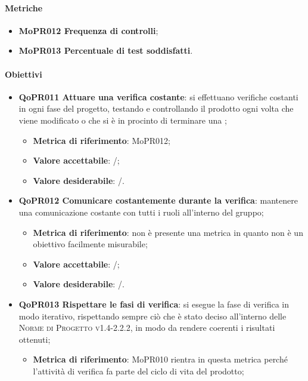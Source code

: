 \documentclass[../piano-di-qualifica.tex]{subfiles}
\begin{document}
\paragraph{Metriche}
\label{sub:metriche_4}
\begin{itemize}
    \item \textbf{MoPR012 Frequenza di controlli};
    \item \textbf{MoPR013 Percentuale di test soddisfatti}.
\end{itemize}

\paragraph{Obiettivi}
\label{sub:obiettivi_4}
\begin{itemize}
    \item \textbf{QoPR011 Attuare una verifica costante}: si effettuano verifiche costanti in ogni fase del progetto, testando e controllando il prodotto ogni volta che viene modificato o che si è in procinto di terminare una ;
    \begin{itemize}
        \item \textbf{Metrica di riferimento}: MoPR012;
        \item \textbf{Valore accettabile}: /; %
        \item \textbf{Valore desiderabile}: /.
    \end{itemize}
    \item \textbf{QoPR012 Comunicare costantemente durante la verifica}: mantenere una comunicazione costante con tutti i ruoli all'interno del gruppo;
    \begin{itemize}
        \item \textbf{Metrica di riferimento}: non è presente una metrica in quanto non è un obiettivo facilmente misurabile;
        \item \textbf{Valore accettabile}: /; %
        \item \textbf{Valore desiderabile}: /.
    \end{itemize}
    \item \textbf{QoPR013 Rispettare le fasi di verifica}: si esegue la fase di verifica in modo iterativo, rispettando sempre ciò che è stato deciso all'interno delle \textsc{Norme di Progetto v1.4-2.2.2}, in modo da rendere coerenti i risultati ottenuti;
        \begin{itemize}
            \item \textbf{Metrica di riferimento}: MoPR010 rientra in questa metrica perché l'attività di verifica fa parte del ciclo di vita del prodotto;

\end{itemize}
\end{itemize}
\end{document}
